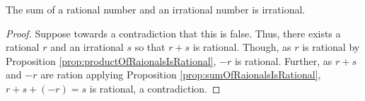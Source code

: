 \guard






\begin{prop}
\label{prop:sumOfRationalAndIrrationalIsIrrational}
  The sum of a rational number and an irrational number is irrational.
\end{prop}
\begin{proof}
  Suppose towards a contradiction that this is false.
  Thus, there exists a rational $r$ and an irrational $s$ so that $r+s$ is rational.
  Though, as $r$ is rational by Proposition \ref{prop:productOfRaionalsIsRational}, $-r$ is rational.
  Further, as $r+s$ and $-r$ are ration applying Proposition \ref{prop:sumOfRaionalsIsRational}, $r+s+(-r)=s$ is rational, a contradiction.
\end{proof}

